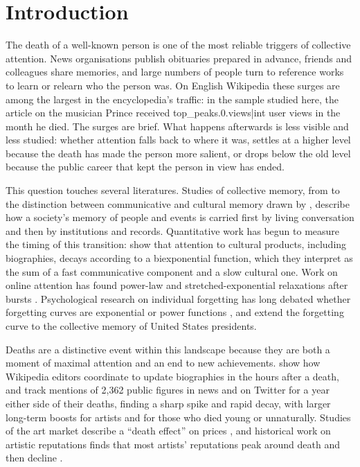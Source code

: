 \documentclass[11pt,a4paper]{article}
\begin{document}
\section{Introduction}
The death of a well-known person is one of the most reliable triggers of collective attention. News organisations publish obituaries prepared in advance, friends and colleagues share memories, and large numbers of people turn to reference works to learn or relearn who the person was. On English Wikipedia these surges are among the largest in the encyclopedia's traffic: in the sample studied here, the article on the musician Prince received {{top_peaks.0.views|int}} user views in the month he died. The surges are brief. What happens afterwards is less visible and less studied: whether attention falls back to where it was, settles at a higher level because the death has made the person more salient, or drops below the old level because the public career that kept the person in view has ended.

This question touches several literatures. Studies of collective memory, from \citet{halbwachs1992} to the distinction between communicative and cultural memory drawn by \citet{assmann1995}, describe how a society's memory of people and events is carried first by living conversation and then by institutions and records. Quantitative work has begun to measure the timing of this transition: \citet{candia2019} show that attention to cultural products, including biographies, decays according to a biexponential function, which they interpret as the sum of a fast communicative component and a slow cultural one. Work on online attention has found power-law and stretched-exponential relaxations after bursts \citep{wu2007,crane2008,ratkiewicz2010,lehmann2012}. Psychological research on individual forgetting has long debated whether forgetting curves are exponential or power functions \citep{wixted1991,rubin1996}, and \citet{roediger2014} extend the forgetting curve to the collective memory of United States presidents.

Deaths are a distinctive event within this landscape because they are both a moment of maximal attention and an end to new achievements. \citet{keegan2015} show how Wikipedia editors coordinate to update biographies in the hours after a death, and \citet{west2021} track mentions of 2,362 public figures in news and on Twitter for a year either side of their deaths, finding a sharp spike and rapid decay, with larger long-term boosts for artists and for those who died young or unnaturally. Studies of the art market describe a ``death effect'' on prices \citep{ekelund2000}, and historical work on artistic reputations finds that most artists' reputations peak around death and then decline \citep{zhang2023}.
\end{document}
